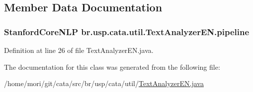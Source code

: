 \subsection{Member Data Documentation}
\hypertarget{classbr_1_1usp_1_1cata_1_1util_1_1_text_analyzer_e_n_aa0bb5c0e8dc4c5fb138742216fea796f}{
\subsubsection[{pipeline}]{\setlength{\rightskip}{0pt plus 5cm}Stanford\+Core\+N\+L\+P br.\+usp.\+cata.\+util.\+Text\+Analyzer\+E\+N.\+pipeline\hspace{0.3cm}{\ttfamily [private]}}}\label{classbr_1_1usp_1_1cata_1_1util_1_1_text_analyzer_e_n_aa0bb5c0e8dc4c5fb138742216fea796f}


Definition at line 26 of file Text\+Analyzer\+E\+N.\+java.



The documentation for this class was generated from the following file\+:\begin{DoxyCompactItemize}
\item 
/home/mori/git/cata/src/br/usp/cata/util/\hyperlink{_text_analyzer_e_n_8java}{Text\+Analyzer\+E\+N.\+java}\end{DoxyCompactItemize}
